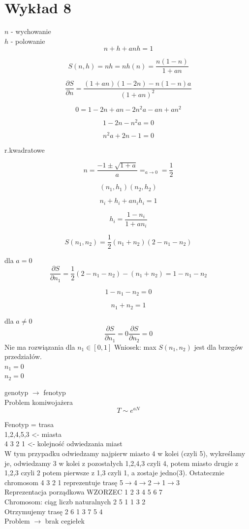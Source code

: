 \documentclass{article}
\begin{document}
		\section{Wykład 8}
		
		$n$ - wychowanie\\
		$h$ - polowanie\\
		
		$$n + h + anh = 1$$
			
		$$ S(n,h) = nh= n h(n) = \frac{n(1-n)}{1+an} $$
		
		$$ \frac{\partial S}{\partial n} = \frac{(1+an)(1-2n) - n(1-n)a}{(1+an)^2} $$
		
		$$ 0 = 1-2n+an-2n^2a-an+an^2 $$

		$$1-2n-n^2a=0 $$

		$$n^2a+2n-1=0$$

		r.kwadratowe

		$$n = \frac{-1 \pm \sqrt{1+a}}{a} =_{a \rightarrow 0} = \frac{1}{2}$$

		$$(n_1 , h_1) (n_2 , h_2)$$

		$$n_i + h_i + an_ih_i=1$$

		$$h_i=\frac{1-n_i}{1+an_i}$$

		$$S(n_1,n_2)=\frac{1}{2} (n_1+n_2)(2-n_1-n_2)$$

		dla $a = 0$
		$$
		\frac{\partial S}{\partial n_1} = \frac{1}{2} (2-n_1-n_2) - (n_1 + n_2) = 1-n_1-n_2
		$$
		
		$$1-n_1-n_2=0$$

		$$n_1+n_2=1$$
		
		dla $a \neq 0$
		$$
		\frac{\partial S}{\partial n_1} =0 \frac{\partial S}{\partial n_2} =0
		$$
		Nie ma rozwiązania dla $n_1 \in [0,1]$
		Wniosek: 
		max $S(n_1,n_2)$ jest dla brzegów przedziałów.\\
		$n_1 = 0 $\\
		$n_2 = 0$
		
		genotyp $\rightarrow$ fenotyp\\
		Problem komiwojażera\\

		$$T \sim e^{aN}$$
		
		Fenotyp = trasa\\
		1,2,4,5,3 <- miasta\\
		4 3 2 1 <- kolejność odwiedzania miast\\
		W tym przypadku odwiedzamy najpierw miasto 4 w kolei (czyli 5), wykreślamy je, odwiedzamy 3 w kolei z pozostałych 1,2,4,3 czyli 4, potem miasto drugie z 1,2,3 czyli 2 potem pierwsze z 1,3 czyli 1, a zostaje jedno(3). Ostatecznie chromosom 4 3 2 1 reprezentuje trasę 5$\rightarrow$4$\rightarrow$2$\rightarrow$1$\rightarrow$3\\
		Reprezentacja porządkowa WZORZEC 1 2 3 4 5 6 7\\
		Chromosom: ciąg liczb naturalnych 2 5 1 1 3 2\\
		Otrzymujemy trasę 2 6 1 3 7 5 4\\
		Problem $\rightarrow$ brak cegiełek
\end{document}
